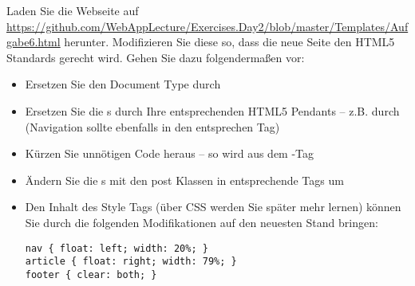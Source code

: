 %
\par Laden Sie die Webseite auf
\url{https://github.com/WebAppLecture/Exercises.Day2/blob/master/Templates/Aufgabe6.html} herunter. Modifizieren Sie
diese so, dass die neue Seite den HTML5 Standards gerecht wird. Gehen Sie dazu
folgendermaßen vor:
%
\begin{itemize}
\item
Ersetzen Sie den Document Type durch 
\item
Ersetzen Sie die s durch Ihre entsprechenden HTML5 Pendants – z.B.
 durch  (Navigation sollte ebenfalls in den
entsprechen Tag)
\item
Kürzen Sie unnötigen Code heraus – so wird aus dem -Tag 
\item
Ändern Sie die s mit den post Klassen in entsprechende 
Tags um
\item
Den Inhalt des Style Tags (über CSS werden Sie später mehr lernen) können Sie
durch die folgenden Modifikationen auf den neuesten Stand bringen:
%
\begin{lstlisting}
nav { float: left; width: 20%; }
article { float: right; width: 79%; }
footer { clear: both; }
\end{lstlisting}
%
\end{itemize}